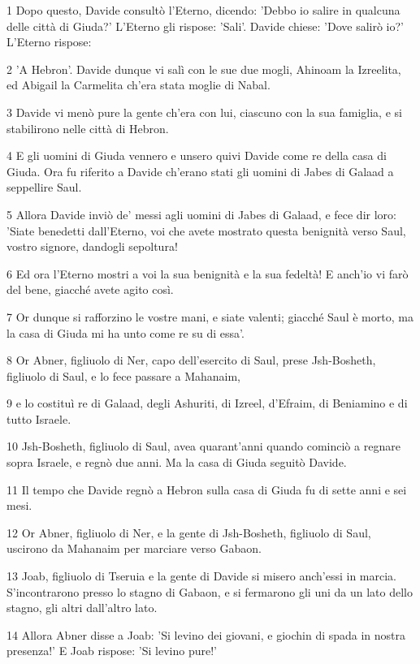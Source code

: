 \par 1 Dopo questo, Davide consultò l'Eterno, dicendo: 'Debbo io salire in qualcuna delle città di Giuda?' L'Eterno gli rispose: 'Sali'. Davide chiese: 'Dove salirò io?' L'Eterno rispose:
\par 2 'A Hebron'. Davide dunque vi salì con le sue due mogli, Ahinoam la Izreelita, ed Abigail la Carmelita ch'era stata moglie di Nabal.
\par 3 Davide vi menò pure la gente ch'era con lui, ciascuno con la sua famiglia, e si stabilirono nelle città di Hebron.
\par 4 E gli uomini di Giuda vennero e unsero quivi Davide come re della casa di Giuda. Ora fu riferito a Davide ch'erano stati gli uomini di Jabes di Galaad a seppellire Saul.
\par 5 Allora Davide inviò de' messi agli uomini di Jabes di Galaad, e fece dir loro: 'Siate benedetti dall'Eterno, voi che avete mostrato questa benignità verso Saul, vostro signore, dandogli sepoltura!
\par 6 Ed ora l'Eterno mostri a voi la sua benignità e la sua fedeltà! E anch'io vi farò del bene, giacché avete agito così.
\par 7 Or dunque si rafforzino le vostre mani, e siate valenti; giacché Saul è morto, ma la casa di Giuda mi ha unto come re su di essa'.
\par 8 Or Abner, figliuolo di Ner, capo dell'esercito di Saul, prese Jsh-Bosheth, figliuolo di Saul, e lo fece passare a Mahanaim,
\par 9 e lo costituì re di Galaad, degli Ashuriti, di Izreel, d'Efraim, di Beniamino e di tutto Israele.
\par 10 Jsh-Bosheth, figliuolo di Saul, avea quarant'anni quando cominciò a regnare sopra Israele, e regnò due anni. Ma la casa di Giuda seguitò Davide.
\par 11 Il tempo che Davide regnò a Hebron sulla casa di Giuda fu di sette anni e sei mesi.
\par 12 Or Abner, figliuolo di Ner, e la gente di Jsh-Bosheth, figliuolo di Saul, uscirono da Mahanaim per marciare verso Gabaon.
\par 13 Joab, figliuolo di Tseruia e la gente di Davide si misero anch'essi in marcia. S'incontrarono presso lo stagno di Gabaon, e si fermarono gli uni da un lato dello stagno, gli altri dall'altro lato.
\par 14 Allora Abner disse a Joab: 'Si levino dei giovani, e giochin di spada in nostra presenza!' E Joab rispose: 'Si levino pure!'
